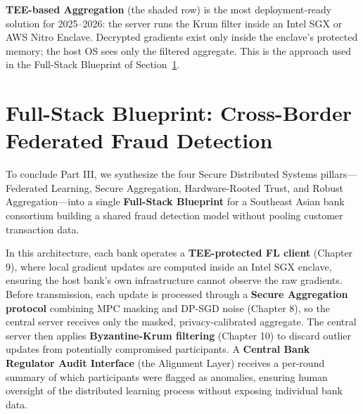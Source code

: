 \textbf{TEE-based Aggregation} (the shaded row) is the most deployment-ready solution for 2025--2026: the server runs the Krum filter inside an Intel SGX or AWS Nitro Enclave. Decrypted gradients exist only inside the enclave's protected memory; the host OS sees only the filtered aggregate. This is the approach used in the Full-Stack Blueprint of Section~\ref{sec:blueprint_federated_fraud}.

\section{Full-Stack Blueprint: Cross-Border Federated Fraud Detection}
\label{sec:blueprint_federated_fraud}

To conclude Part III, we synthesize the four Secure Distributed Systems pillars---Federated Learning, Secure Aggregation, Hardware-Rooted Trust, and Robust Aggregation---into a single \textbf{Full-Stack Blueprint} for a Southeast Asian bank consortium building a shared fraud detection model without pooling customer transaction data.

In this architecture, each bank operates a \textbf{TEE-protected FL client} (Chapter 9), where local gradient updates are computed inside an Intel SGX enclave, ensuring the host bank's own infrastructure cannot observe the raw gradients. Before transmission, each update is processed through a \textbf{Secure Aggregation protocol} combining MPC masking and DP-SGD noise (Chapter 8), so the central server receives only the masked, privacy-calibrated aggregate. The central server then applies \textbf{Byzantine-Krum filtering} (Chapter 10) to discard outlier updates from potentially compromised participants. A \textbf{Central Bank Regulator Audit Interface} (the Alignment Layer) receives a per-round summary of which participants were flagged as anomalies, ensuring human oversight of the distributed learning process without exposing individual bank data.

